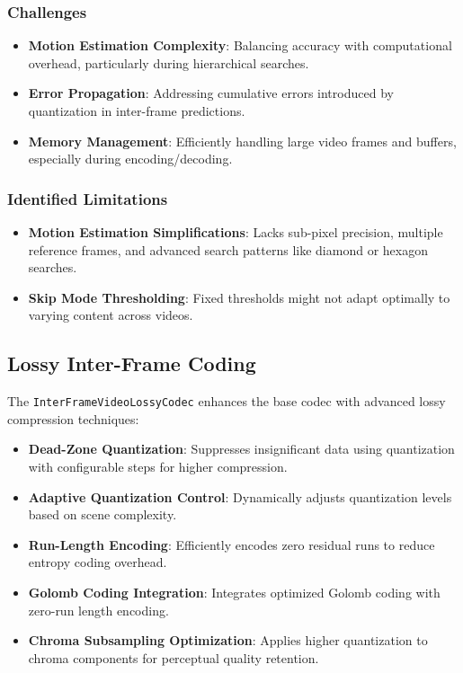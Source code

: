 \documentclass[a4paper,14pt]{article}
\begin{document}
\subsubsection{Challenges}
\begin{itemize}
\item \textbf{Motion Estimation Complexity}: Balancing accuracy with computational overhead, particularly during hierarchical searches.
\item \textbf{Error Propagation}: Addressing cumulative errors introduced by quantization in inter-frame predictions.
\item \textbf{Memory Management}: Efficiently handling large video frames and buffers, especially during encoding/decoding.
\end{itemize}

\subsubsection{Identified Limitations}
\begin{itemize}
\item \textbf{Motion Estimation Simplifications}: Lacks sub-pixel precision, multiple reference frames, and advanced search patterns like diamond or hexagon searches.
\item \textbf{Skip Mode Thresholding}: Fixed thresholds might not adapt optimally to varying content across videos.
\end{itemize}

\subsection{Lossy Inter-Frame Coding}
The \texttt{InterFrameVideoLossyCodec} enhances the base codec with advanced lossy compression techniques:

\begin{itemize}
\item \textbf{Dead-Zone Quantization}: Suppresses insignificant data using quantization with configurable steps for higher compression.
\item \textbf{Adaptive Quantization Control}: Dynamically adjusts quantization levels based on scene complexity.
\item \textbf{Run-Length Encoding}: Efficiently encodes zero residual runs to reduce entropy coding overhead.
\item \textbf{Golomb Coding Integration}: Integrates optimized Golomb coding with zero-run length encoding.
\item \textbf{Chroma Subsampling Optimization}: Applies higher quantization to chroma components for perceptual quality retention.
\end{itemize}
\end{document}
